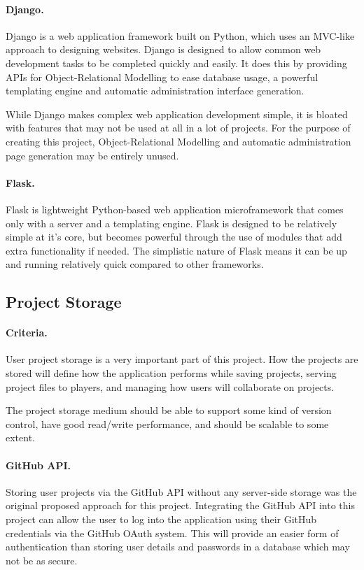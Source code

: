 \paragraph{Django.}
Django is a web application framework built on Python, which uses an MVC-like approach to designing websites.\cite{django} Django is designed to allow common web development tasks to be completed quickly and easily. It does this by providing APIs for Object-Relational Modelling to ease database usage, a powerful templating engine and automatic administration interface generation.\cite{djangooverview}

While Django makes complex web application development simple, it is bloated with features that may not be used at all in a lot of projects. For the purpose of creating this project, Object-Relational Modelling and automatic administration page generation may be entirely unused. 

\paragraph{Flask.}
Flask is lightweight Python-based web application microframework that comes only with a server and a templating engine. Flask is designed to be relatively simple at it's core, but becomes powerful through the use of modules that add extra functionality if needed.\cite{flask} The simplistic nature of Flask means it can be up and running relatively quick compared to other frameworks.

\subsection{Project Storage}
\paragraph{Criteria.}
User project storage is a very important part of this project. How the projects are stored will define how the application performs while saving projects, serving project files to players, and managing how users will collaborate on projects.

The project storage medium should be able to support some kind of version control, have good read/write performance, and should be scalable to some extent.

\paragraph{GitHub API.}
Storing user projects via the GitHub API without any server-side storage was the original proposed approach for this project.\cite{githubapi} Integrating the GitHub API into this project can allow the user to log into the application using their GitHub credentials via the GitHub OAuth system. \cite{githuboauth} This will provide an easier form of authentication than storing user details and passwords in a database which may not be as secure.

